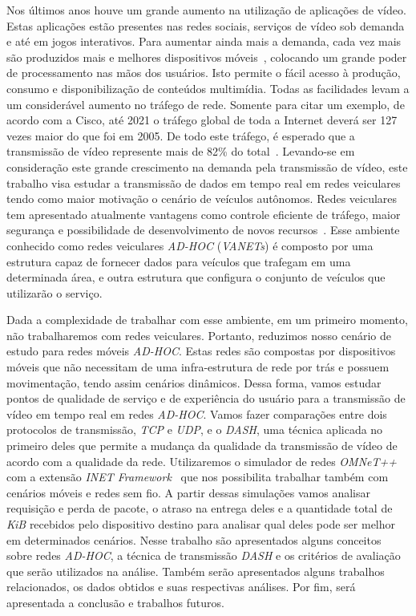 \documentclass[12pt]{article}
\begin{document}
    Nos últimos anos houve um grande aumento na utilização de aplicações de vídeo. Estas aplicações estão presentes nas redes sociais, serviços de vídeo sob demanda e até em jogos interativos. Para aumentar ainda mais a demanda, cada vez mais são produzidos mais e melhores dispositivos móveis~\cite{Adobe2017}, colocando um grande poder de processamento nas mãos dos usuários. Isto permite o fácil acesso à produção, consumo e disponibilização de conteúdos multimídia. Todas as facilidades levam a um considerável aumento no tráfego de rede. Somente para citar um exemplo, de acordo com a Cisco, até 2021 o tráfego global de toda a Internet deverá ser 127 vezes maior do que foi em 2005. De todo este tráfego, é esperado que a transmissão de vídeo represente mais de 82\% do total~\cite{Cisco2017}. Levando-se em consideração este grande crescimento na demanda pela transmissão de vídeo, este trabalho visa estudar a transmissão de dados em tempo real em redes veiculares tendo como maior motivação o cenário de veículos autônomos. Redes veiculares tem apresentado atualmente vantagens como controle eficiente de tráfego, maior segurança e possibilidade de desenvolvimento de novos recursos~\cite{Yi:2015:SFC:2757384.2757397}. Esse ambiente conhecido como redes veiculares \textit{AD-HOC} (\textit{VANETs}) é composto por uma estrutura capaz de fornecer dados para veículos que trafegam em uma determinada área, e outra estrutura que configura o conjunto de veículos que utilizarão o serviço.
    
	Dada a complexidade de trabalhar com esse ambiente, em um primeiro momento, não trabalharemos com redes veiculares. Portanto, reduzimos nosso cenário de estudo para redes móveis \textit{AD-HOC}. Estas redes são compostas por dispositivos móveis que não necessitam de uma infra-estrutura de rede por trás e possuem movimentação, tendo assim cenários dinâmicos. Dessa forma, vamos estudar pontos de qualidade de serviço e de experiência do usuário para a transmissão de vídeo em tempo real em redes \textit{AD-HOC}. Vamos fazer comparações entre dois protocolos de transmissão, \textit{TCP} e \textit{UDP}, e o \textit{DASH}, uma técnica aplicada no primeiro deles que permite a mudança da qualidade da transmissão de vídeo de acordo com a qualidade da rede. Utilizaremos o simulador de redes \textit{OMNeT++}~\cite{omnet} com a extensão\textit{ INET Framework}~\cite{inet} que nos possibilita trabalhar também com cenários móveis e redes sem fio. A partir dessas simulações vamos analisar requisição e perda de pacote, o atraso na entrega deles e a quantidade total de \textit{KiB} recebidos pelo dispositivo destino para analisar qual deles pode ser melhor em determinados cenários.
    Nesse trabalho são apresentados alguns conceitos sobre redes \textit{AD-HOC}, a técnica de transmissão \textit{DASH} e os critérios de avaliação que serão utilizados na análise. Também serão apresentados alguns trabalhos relacionados, os dados obtidos e suas respectivas análises. Por fim, será apresentada a conclusão e trabalhos futuros.
    
\end{document}
